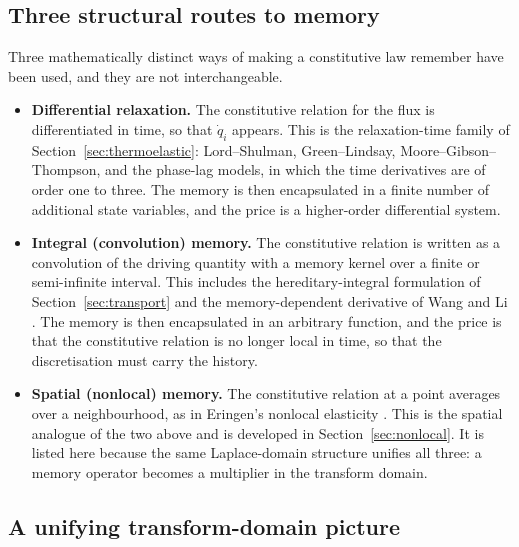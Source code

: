 \subsection{Three structural routes to memory}

Three mathematically distinct ways of making a constitutive law remember have been used, and they are not interchangeable.

\begin{itemize}
\item \textbf{Differential relaxation.} The constitutive relation for the flux is differentiated in time, so that $\dot{q}_i$ appears. This is the relaxation-time family of Section~\ref{sec:thermoelastic}: Lord--Shulman, Green--Lindsay, Moore--Gibson--Thompson, and the phase-lag models, in which the time derivatives are of order one to three. The memory is then encapsulated in a finite number of additional state variables, and the price is a higher-order differential system.
\item \textbf{Integral (convolution) memory.} The constitutive relation is written as a convolution of the driving quantity with a memory kernel over a finite or semi-infinite interval. This includes the hereditary-integral formulation of Section~\ref{sec:transport} and the memory-dependent derivative of Wang and Li \cite{Wang2011}. The memory is then encapsulated in an arbitrary function, and the price is that the constitutive relation is no longer local in time, so that the discretisation must carry the history.
\item \textbf{Spatial (nonlocal) memory.} The constitutive relation at a point averages over a neighbourhood, as in Eringen's nonlocal elasticity \cite{Eringen1972}. This is the spatial analogue of the two above and is developed in Section~\ref{sec:nonlocal}. It is listed here because the same Laplace-domain structure unifies all three: a memory operator becomes a multiplier in the transform domain.
\end{itemize}

\subsection{A unifying transform-domain picture}

